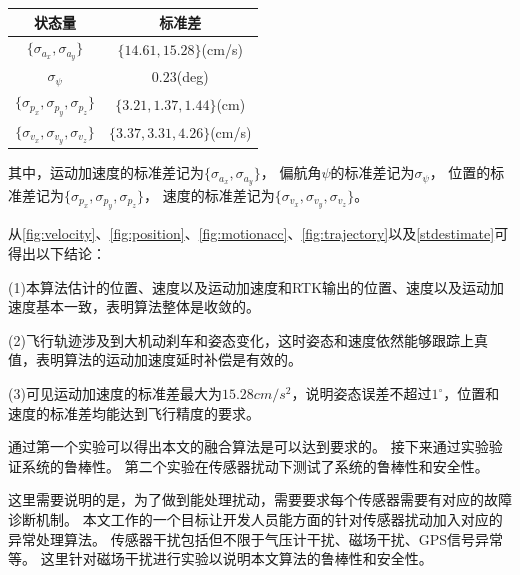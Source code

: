 \documentclass[
  type=master
]{gdutthesis}
\begin{document}
\begin{table}[h]
	\label{stdestimate}
	\begin{tabular}{cc}
		\toprule
		状态量 & 标准差 \\
		\midrule
		$\big\{ \sigma_{a_x},\sigma_{a_y} \big\}$ & $\big\{ 14.61, 15.28 \big\}$(cm/s) \\
		$\sigma_{\psi}$ & $0.23$(deg)   \\
		$\big\{ \sigma_{p_x},\sigma_{p_y},\sigma_{p_z} \big\}$ & $\big\{ 3.21, 1.37, 1.44 \big\}$(cm)   \\
		$\big\{ \sigma_{v_x},\sigma_{v_y},\sigma_{v_z} \big\}$ & $\big\{ 3.37, 3.31, 4.26 \big\}$(cm/s)   \\
		\bottomrule
	\end{tabular}
\end{table}

其中，运动加速度的标准差记为$\big\{ \sigma_{a_x},\sigma_{a_y} \big\}$，
偏航角$\psi$的标准差记为$\sigma_{\psi}$，
位置的标准差记为$\big\{ \sigma_{p_x},\sigma_{p_y},\sigma_{p_z} \big\}$，
速度的标准差记为$\big\{ \sigma_{v_x},\sigma_{v_y},\sigma_{v_z} \big\}$。

从\autoref{fig:velocity}、\autoref{fig:position}、\autoref{fig:motionacc}、\autoref{fig:trajectory}以及\autoref{stdestimate}可得出以下结论：

(1)本算法估计的位置、速度以及运动加速度和RTK输出的位置、速度以及运动加速度基本一致，表明算法整体是收敛的。

(2)飞行轨迹涉及到大机动刹车和姿态变化，这时姿态和速度依然能够跟踪上真值，表明算法的运动加速度延时补偿是有效的。

(3)可见运动加速度的标准差最大为$15.28cm/s^2$，说明姿态误差不超过$1^{\circ}$，位置和速度的标准差均能达到飞行精度的要求。

通过第一个实验可以得出本文的融合算法是可以达到要求的。
接下来通过实验验证系统的鲁棒性。
第二个实验在传感器扰动下测试了系统的鲁棒性和安全性。

这里需要说明的是，为了做到能处理扰动，需要要求每个传感器需要有对应的故障诊断机制。
本文工作的一个目标让开发人员能方面的针对传感器扰动加入对应的异常处理算法。
传感器干扰包括但不限于气压计干扰、磁场干扰、GPS信号异常等。
这里针对磁场干扰进行实验以说明本文算法的鲁棒性和安全性。
\end{document}
